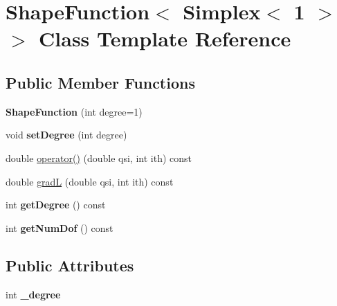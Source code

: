 \hypertarget{class_shape_function_3_01_simplex_3_011_01_4_01_4}{
\section{ShapeFunction$<$ Simplex$<$ 1 $>$ $>$ Class Template Reference}
\label{class_shape_function_3_01_simplex_3_011_01_4_01_4}
}
\subsection*{Public Member Functions}
\begin{DoxyCompactItemize}
\item 
\hypertarget{class_shape_function_3_01_simplex_3_011_01_4_01_4_a3c2ff330e747a3cd5f12696302efe16b}{
{\bfseries ShapeFunction} (int degree=1)}
\label{class_shape_function_3_01_simplex_3_011_01_4_01_4_a3c2ff330e747a3cd5f12696302efe16b}

\item 
\hypertarget{class_shape_function_3_01_simplex_3_011_01_4_01_4_a33631b40d5c29a6cc019f2c6befdd0c1}{
void {\bfseries setDegree} (int degree)}
\label{class_shape_function_3_01_simplex_3_011_01_4_01_4_a33631b40d5c29a6cc019f2c6befdd0c1}

\item 
double \hyperlink{class_shape_function_3_01_simplex_3_011_01_4_01_4_aab8e25c7ebb99a9fec9df10f817e7489}{operator()} (double qsi, int ith) const 
\item 
double \hyperlink{class_shape_function_3_01_simplex_3_011_01_4_01_4_a560713b0e35ca51557c9db2d884067a9}{gradL} (double qsi, int ith) const 
\item 
\hypertarget{class_shape_function_3_01_simplex_3_011_01_4_01_4_ae185406835191febc4eee374dff492b8}{
int {\bfseries getDegree} () const }
\label{class_shape_function_3_01_simplex_3_011_01_4_01_4_ae185406835191febc4eee374dff492b8}

\item 
\hypertarget{class_shape_function_3_01_simplex_3_011_01_4_01_4_af7b36f6c9bb5835370e060ba96a29ba0}{
int {\bfseries getNumDof} () const }
\label{class_shape_function_3_01_simplex_3_011_01_4_01_4_af7b36f6c9bb5835370e060ba96a29ba0}

\end{DoxyCompactItemize}
\subsection*{Public Attributes}
\begin{DoxyCompactItemize}
\item 
\hypertarget{class_shape_function_3_01_simplex_3_011_01_4_01_4_a78bc90286f52aa7ad4e23038055464b6}{
int {\bfseries \_\-degree}}
\label{class_shape_function_3_01_simplex_3_011_01_4_01_4_a78bc90286f52aa7ad4e23038055464b6}

\end{DoxyCompactItemize}
